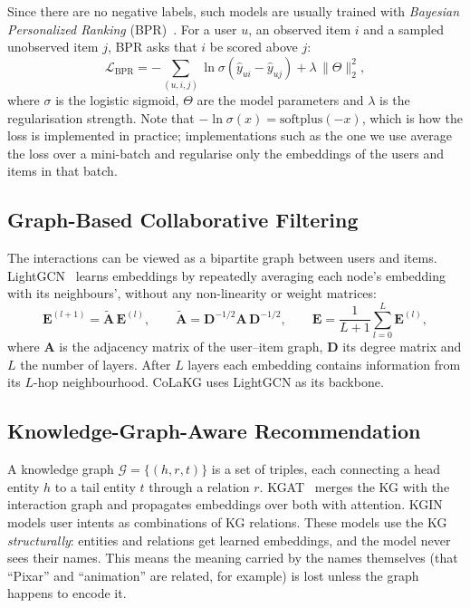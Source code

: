 \documentclass[a4paper,11pt]{article}
\begin{document}
Since there are no negative labels, such models are usually trained with \emph{Bayesian Personalized Ranking} (BPR)~\cite{rendle2009bpr}. For a user $u$, an observed item $i$ and a sampled unobserved item $j$, BPR asks that $i$ be scored above $j$:
\begin{equation}
\label{eq:bpr}
\mathcal{L}_{\text{BPR}} = -\sum_{(u,i,j)} \ln \sigma\!\left(\hat{y}_{ui}-\hat{y}_{uj}\right) + \lambda\,\lVert\Theta\rVert_2^2,
\end{equation}
where $\sigma$ is the logistic sigmoid, $\Theta$ are the model parameters and $\lambda$ is the regularisation strength. Note that $-\ln\sigma(x)=\mathrm{softplus}(-x)$, which is how the loss is implemented in practice; implementations such as the one we use average the loss over a mini-batch and regularise only the embeddings of the users and items in that batch.

\subsection{Graph-Based Collaborative Filtering}
The interactions can be viewed as a bipartite graph between users and items. LightGCN~\cite{he2020lightgcn} learns embeddings by repeatedly averaging each node's embedding with its neighbours', without any non-linearity or weight matrices:
\begin{equation}
\label{eq:lightgcn}
\mathbf{E}^{(l+1)} = \tilde{\mathbf{A}}\,\mathbf{E}^{(l)}, \qquad
\tilde{\mathbf{A}} = \mathbf{D}^{-1/2}\mathbf{A}\,\mathbf{D}^{-1/2}, \qquad
\mathbf{E} = \frac{1}{L+1}\sum_{l=0}^{L}\mathbf{E}^{(l)},
\end{equation}
where $\mathbf{A}$ is the adjacency matrix of the user--item graph, $\mathbf{D}$ its degree matrix and $L$ the number of layers. After $L$ layers each embedding contains information from its $L$-hop neighbourhood. CoLaKG uses LightGCN as its backbone.

\subsection{Knowledge-Graph-Aware Recommendation}
A knowledge graph $\mathcal{G}=\{(h,r,t)\}$ is a set of triples, each connecting a head entity $h$ to a tail entity $t$ through a relation $r$. KGAT~\cite{wang2019kgat} merges the KG with the interaction graph and propagates embeddings over both with attention. KGIN~\cite{wang2021kgin} models user intents as combinations of KG relations. These models use the KG \emph{structurally}: entities and relations get learned embeddings, and the model never sees their names. This means the meaning carried by the names themselves (that ``Pixar'' and ``animation'' are related, for example) is lost unless the graph happens to encode it.
\end{document}
